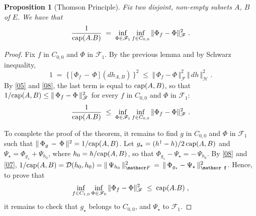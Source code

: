 \documentclass[reqno]{amsart}
\newtheorem{proposition}[theorem]{Proposition}
\newcounter{as}[section]
\newcommand{\mc}[1]{{\mathcal #1}}
\newcommand{\ms}[1]{{\mathscr #1}}
\newcommand{\<}{\langle}
\renewcommand{\>}{\rangle}
\renewcommand{\Cap}{{\rm cap}}
\begin{document}
\begin{proposition}[Thomson Principle]
\label{prop2}
Fix two disjoint, non-empty subsets $A$, $B$ of $E$. We have that
\begin{equation*}
\frac 1{\Cap(A.B)} \;=\; \inf_{\Phi\in \ms F_1}  \inf_{f\in C_{0,0}} 
\|\Phi_f-\Phi\|_{\ms F}^2 \;.
\end{equation*}
\end{proposition}

\begin{proof}
Fix $f$ in $C_{0,0}$ and $\Phi$ in $\ms F_1$. By the previous lemma
and by Schwarz inequality,
\begin{equation*}
1\; =\; \Big\{\, \big[\, \Phi_f \,-\, \Phi\, \big] \,
(dh_{A,B}) \,\Big\}^2
\;\le\; \big\Vert\, \Phi_f - \Phi \, \big\Vert_{\ms F}^2 \,
\big\Vert\, dh \, \big\Vert_{\ms H}^2 \;.
\end{equation*}
By \eqref{05} and \eqref{08}, the last term is equal to $\Cap(A,B)$,
so that $1/\Cap(A,B)\le \Vert\, \Phi_f- \Phi \,\Vert_{\ms F}^2$ for
every $f$ in $C_{0,0}$ and $\Phi$ in $\ms F_1$:
\begin{equation*}
\frac 1{\Cap(A.B)} \;\le\; \inf_{\Phi\in \ms F_1}  \inf_{f\in C_{0,0}} 
\|\Phi_f-\Phi\|_{\ms F}^2 \;.
\end{equation*}

To complete the proof of the theorem, it remains to find $g$ in
$C_{0,0}$ and $\Phi$ in $\ms F_{1}$ such that $\Vert\, \Phi_g \,-\,
\Phi\, \Vert^2 = 1/\Cap (A,B)$.  Let $g_\star = (h^\dagger-h)/2 \, \Cap
(A,B)$ and $\Psi_\star = \Phi_{g_\star} + \Psi_{h_0}$, where $h_0 =
h/\Cap (A,B)$, so that $\Phi_{g_\star} - \Psi_\star = -\, \Psi_{h_0}$. By
\eqref{08} and \eqref{07}, $1/\Cap(A,B)= \mc D(h_0,h_0) = \Vert\,
\Psi_{h_0} \,\Vert_{\ms F}^2 \,=\, \Vert\, \Phi_{g_\star} - \Psi_\star
\,\Vert_{\ms f}^2$. Hence, to prove that \begin{equation*}
\inf_{f\in C_{1,0}} \inf_{\Phi\in \ms F_0} 
\|\Phi_f-\Phi\|_{\ms F}^2 \;\le\; \Cap(A.B) \;,
\end{equation*}
it remains to check that $g_\star$ belongs to $C_{0,0}$, and
$\Psi_\star$ to $\ms F_1$. 


\end{proof}
\end{document}
